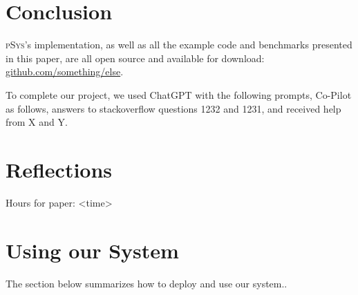 \documentclass[sigplan, screen, 10pt]{acmart}
\newcommand{\sys}{{\scshape pSys}\xspace}
\begin{document}
\section{Conclusion}
\label{conclusion}

\sys's implementation, as well as all the example code and benchmarks presented in this paper, are all open source and available for download:
\href{https://github.com/something/else}{github.com/something/else}.

\begin{acks}
To complete our project, we used ChatGPT with the following prompts, Co-Pilot as follows, answers to stackoverflow questions 1232 and 1231, and received help from X and Y.
\end{acks}

{\small

}

\appendix

\section{Reflections}
\label{reflections}



Hours for paper: <time>

\section{Using our System}
\label{using-apx}

The section below summarizes how to deploy and use our system..
\end{document}
